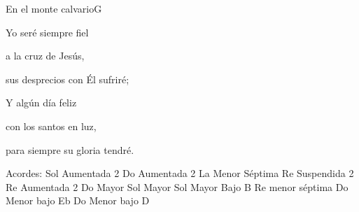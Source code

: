 \documentclass[12pt, spanish]{book}
\begin{document}
\begin{song}{En el monte calvario}{G}
        \begin{SBOpGroup}
            Yo seré siempre fiel

            a la cruz de Jesús,

            sus desprecios con Él sufriré;

            Y algún día feliz

            con los santos en luz,

            para siempre su gloria tendré.
        \end{SBOpGroup}

        \ifChordBk
        \begin{SBOpGroup}
            Acordes:\break
            \upchord{\Gtwo}\qquad Sol Aumentada 2 \hfill
            \upchord{\Ctwo}\qquad Do Aumentada 2 \hfill\null\break
            \upchord{\Amseven}\qquad La Menor S\'eptima \hfill
            \upchord{\Dsustwo}Re Suspendida 2 \hfill\null\break
            \upchord{\Dtwo}\qquad Re Aumentada 2 \hfill
            \upchord{\C}\qquad Do Mayor \hfill\null\break
            \upchord{\G}\qquad Sol Mayor \hfill
            \upchord{\GB}Sol Mayor Bajo B \hfill\null\break
            \upchord{\Dmseven}Re menor s\'eptima \hfill
            \upchord{\CmEflat}Do Menor bajo Eb \hfill\null\break
            \upchord{\CmD}Do Menor bajo D \hfill\null\break
        \end{SBOpGroup}
        \fi
    \end{song}
\end{document}
